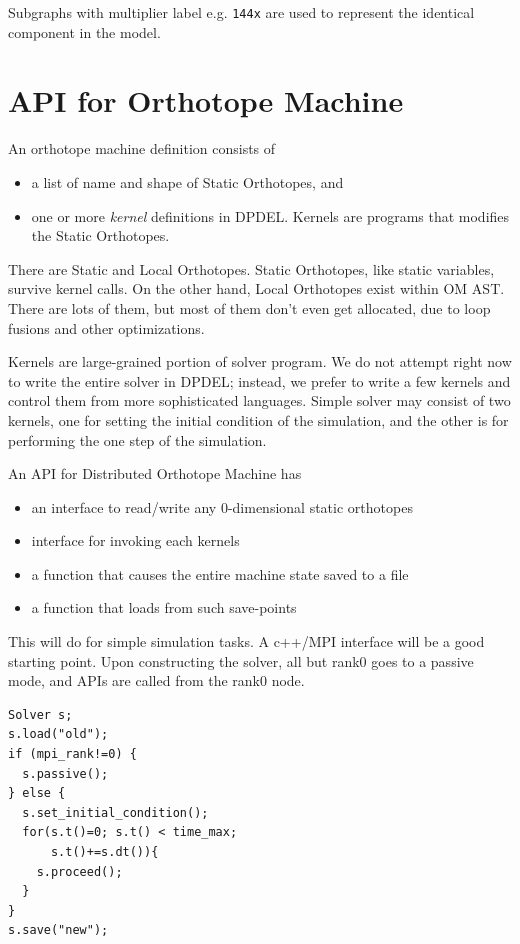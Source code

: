 \documentclass[twocolumn]{article}
\begin{document}
Subgraphs with multiplier label e.g. {\tt 144x} are used to represent the
identical component in the model.



\section{API for Orthotope Machine}

An orthotope machine definition consists of
\begin{itemize}
  \item a list of name and shape of Static Orthotopes, and
  \item one or more {\em kernel} definitions in DPDEL. Kernels are programs
    that modifies the Static Orthotopes.
\end{itemize}

There are Static and Local Orthotopes. Static Orthotopes, like static
variables, survive kernel calls. On the other hand, Local Orthotopes exist
within OM AST. There are lots of them, but most of them don't even get
allocated, due to loop fusions and other optimizations.

Kernels are large-grained portion of solver program. We do not attempt right
now to write the entire solver in DPDEL; instead, we prefer to write a few
kernels and control them from more sophisticated languages. Simple solver may
consist of two kernels, one for setting the initial condition of the
simulation, and the other is for performing the one step of the simulation.

An API for Distributed Orthotope Machine has
\begin{itemize}
  \item an interface to read/write any 0-dimensional static orthotopes
  \item interface for invoking each kernels
  \item a function that causes the entire machine state saved to a file
  \item a function that loads from such save-points
\end{itemize}

This will do for simple simulation tasks. A c++/MPI interface will be a good
starting point. Upon constructing the solver, all but rank0 goes to a passive
mode, and APIs are called from the rank0 node.

\begin{verbatim}
Solver s;
s.load("old");
if (mpi_rank!=0) {
  s.passive();
} else {
  s.set_initial_condition();
  for(s.t()=0; s.t() < time_max;
      s.t()+=s.dt()){
    s.proceed();
  }
}
s.save("new");
\end{verbatim}
\end{document}
